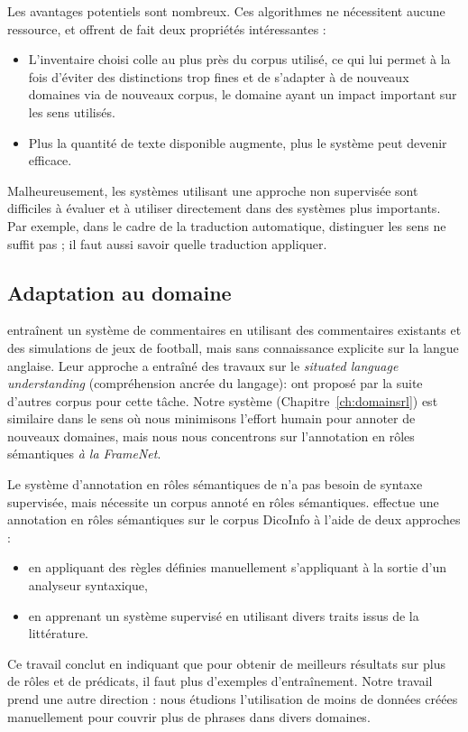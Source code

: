 Les avantages potentiels sont nombreux. Ces algorithmes ne nécessitent aucune
ressource, et offrent de fait deux propriétés intéressantes :

\begin{itemize}

    \item L'inventaire choisi colle au plus près du corpus utilisé, ce qui lui
        permet à la fois d'éviter des distinctions trop fines et de s'adapter à
        de nouveaux domaines via de nouveaux corpus, le domaine ayant un impact
        important sur les sens utilisés.

    \item Plus la quantité de texte disponible augmente, plus le système peut
        devenir efficace.

\end{itemize}

Malheureusement, les systèmes utilisant une approche non supervisée sont
difficiles à évaluer et à utiliser directement dans des systèmes plus
importants. Par exemple, dans le cadre de la traduction automatique, distinguer
les sens ne suffit pas ; il faut aussi savoir quelle traduction appliquer.

\subsection{Adaptation au domaine}

\cite{chen2008learning} entraînent un système de commentaires en utilisant des
commentaires existants et des simulations de jeux de football, mais sans
connaissance explicite sur la langue anglaise. Leur approche a entraîné des
travaux sur le \emph{situated language understanding} (compréhension ancrée du
langage): \cite{bordes2010towards,richardson2012towards} ont proposé par la
suite d'autres corpus pour cette tâche. Notre système
(Chapitre~\ref{ch:domainsrl}) est similaire dans le sens où nous minimisons
l'effort humain pour annoter de nouveaux domaines, mais nous nous concentrons
sur l'annotation en rôles sémantiques \emph{à la FrameNet}.

Le système d'annotation en rôles sémantiques de \cite{gormley2014low} n'a pas
besoin de syntaxe supervisée, mais nécessite un corpus annoté en rôles
sémantiques. \cite{hadouche2011annotation} effectue une annotation en rôles
sémantiques sur le corpus DicoInfo \citep{corpusolst} à l'aide de deux
approches :

\begin{itemize}
    \item en appliquant des règles définies manuellement s'appliquant à la
        sortie d'un analyseur syntaxique,
    \item en apprenant un système supervisé en utilisant divers traits issus de
        la littérature.
\end{itemize}

Ce travail conclut en indiquant que pour obtenir de meilleurs résultats sur
plus de rôles et de prédicats, il faut plus d'exemples d'entraînement. Notre
travail prend une autre direction : nous étudions l'utilisation de moins de
données créées manuellement pour couvrir plus de phrases dans divers domaines.
